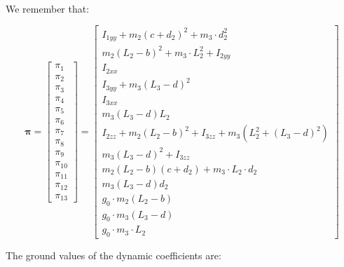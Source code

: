 \documentclass{article}
\begin{document}
\paragraph{}We remember that:

\[\bm{\pi}= \begin{bmatrix}
\pi_1 \\ \pi_2 \\ \pi_3 \\ \pi_4 \\ \pi_5 \\ \pi_6 \\ \pi_7 \\ \pi_8 \\  \pi_9 \\ \pi_{10} \\ \pi_{11} \\ \pi_{12} \\ \pi_{13}
\end{bmatrix} = \begin{bmatrix}
I_{1yy}+m_2(c+d_2)^2+m_3\cdot d_2^2 \\ m_2(L_2 -b)^2 + m_3\cdot L_2^2 + I_{2yy} \\ I_{2xx} \\ I_{3yy} + m_3(L_3 - d)^2 \\ I_{3xx} \\ m_3(L_3 -d)L_2 \\ I_{2zz} + m_2(L_2 - b)^2 + I_{3zz} + m_3(L_2^2 + (L_3 - d)^2 ) \\ m_3(L_3 -d)^2 + I_{3zz} \\ m_2(L_2 - b)(c+ d_2) + m_3\cdot L_2\cdot d_2 \\ m_3(L_3 - d)d_2 \\ g_0\cdot m_2(L_2 - b) \\ g_0\cdot m_3(L_3 - d) \\ g_0\cdot m_3\cdot L_2
\end{bmatrix}\]

The ground values of the dynamic coefficients are:
\end{document}
